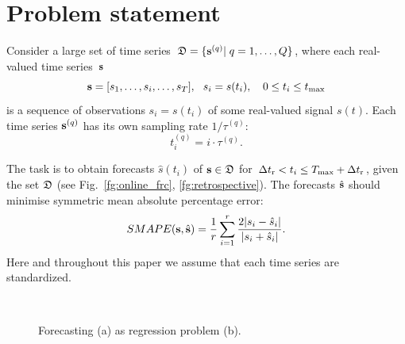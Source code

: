 \documentclass[conference]{IEEEtran}
\begin{document}
\section{Problem statement}
Consider a large set of time series~${\mathfrak{D}}=\{{\mathbf{s}}^{(q)}| \; q = 1,\dots, {Q}\}$, where each real-valued time series~${\mathbf{s}}$
\[ {\mathbf{s}} = [s_1, \dots, s_i, \dots, s_{T}], ~~ s_i = s(t_i),\quad 0 \leq t_i \leq t_{\max}\]
is a sequence of observations $s_i = s(t_i)$ of some real-valued signal $s(t)$.
Each time series ${\mathbf{s}}^{(q)}$ has its own sampling rate $1/\tau^{(q)}$:
\[t_i^{(q)} = {i}\cdot\tau^{(q)}.\]

 The task is to obtain forecasts $\hat{s}(t_i)$ of ${\mathbf{s}} \in {\mathfrak{D}}$ for  $\Delta t_\text{r} <  t_i \leq T_{\max} + \Delta t_\text{r}$, given the set  ${\mathfrak{D}}$ (see Fig.~\ref{fg:online_frc}, \ref{fg:retrospective}). The forecasts $\hat{{\mathbf{s}}}$ should minimise symmetric mean absolute percentage error:
 \begin{equation}\label{eq:MAPE}
 SMAPE(\bs, \hat{\bs}) = \frac{1}{r}\sum_{i = 1}^{r} \frac{2|s_i - \hat{s}_i|}{|s_i + \hat{s}_i|}. \end{equation}
 Here and throughout this paper we assume that each time series are standardized. 
 


\begin{figure}[!ht]
\centering
{} \\
\centering {}
\caption{Forecasting (a) as regression problem (b).}
\end{figure}
\end{document}
